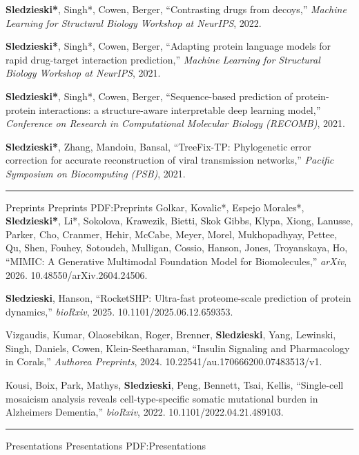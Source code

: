 \documentclass[letterpaper,MMMyyyy,nonstopmode]{simpleresumecv}
\begin{document}
\begin{Body}
\Gap
\NumberedItem{[4]}
{{\textbf{Sledzieski*}, Singh*, Cowen, Berger}, 
``Contrasting drugs from decoys,'' 
\textit{Machine Learning for Structural Biology Workshop at NeurIPS}, 2022.
}

\Gap
\NumberedItem{[3]}
{{\textbf{Sledzieski*}, Singh*, Cowen, Berger}, 
``Adapting protein language models for rapid drug-target interaction prediction,'' 
\textit{Machine Learning for Structural Biology Workshop at NeurIPS}, 2021.
}

\Gap
\NumberedItem{[2]}
{{\textbf{Sledzieski*}, Singh*, Cowen, Berger}, 
``Sequence-based prediction of protein-protein interactions: a structure-aware interpretable deep learning model,'' 
\textit{Conference on Research in Computational Molecular Biology (RECOMB)}, 2021.
}

\Gap
\NumberedItem{[1]}
{{\textbf{Sledzieski*}, Zhang, Mandoiu, Bansal}, 
``TreeFix-TP: Phylogenetic error correction for accurate reconstruction of viral transmission networks,'' 
\textit{Pacific Symposium on Biocomputing (PSB)}, 2021.
}


\BigGap
\hrule
\Section
{Preprints}
{Preprints}
{PDF:Preprints}
\Gap
\NumberedItem{[4]}
{{Golkar, Kovalic*, Espejo Morales*, \textbf{Sledzieski*}, Li*, Sokolova, Krawezik, Bietti, Skok Gibbs, Klypa, Xiong, Lanusse, Parker, Cho, Cranmer, Hehir, McCabe, Meyer, Morel, Mukhopadhyay, Pettee, Qu, Shen, Fouhey, Sotoudeh, Mulligan, Cossio, Hanson, Jones, Troyanskaya, Ho}, 
``MIMIC: A Generative Multimodal Foundation Model for Biomolecules,'' 
\textit{arXiv}, 2026. 10.48550/arXiv.2604.24506.
}

\Gap
\NumberedItem{[3]}
{{\textbf{Sledzieski}, Hanson}, 
``RocketSHP: Ultra-fast proteome-scale prediction of protein dynamics,'' 
\textit{bioRxiv}, 2025. 10.1101/2025.06.12.659353.
}

\Gap
\NumberedItem{[2]}
{{Vizgaudis, Kumar, Olaosebikan, Roger, Brenner, \textbf{Sledzieski}, Yang, Lewinski, Singh, Daniels, Cowen, Klein-Seetharaman}, 
``Insulin Signaling and Pharmacology in Corals,'' 
\textit{Authorea Preprints}, 2024. 10.22541/au.170666200.07483513/v1.
}

\Gap
\NumberedItem{[1]}
{{Kousi, Boix, Park, Mathys, \textbf{Sledzieski}, Peng, Bennett, Tsai, Kellis}, 
``Single-cell mosaicism analysis reveals cell-type-specific somatic mutational burden in Alzheimers Dementia,'' 
\textit{bioRxiv}, 2022. 10.1101/2022.04.21.489103.
}



\BigGap
\hrule
\Section
{Presentations}
{Presentations}
{PDF:Presentations}


\end{Body}
\end{document}
